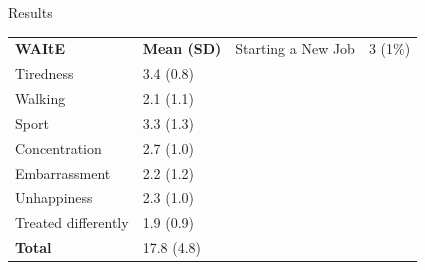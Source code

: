 \documentclass[t,compress,9pt,aspectratio=169]{beamer}
\begin{document}
\begin{frame}{Results}
\begin{table}[h]
\begin{tabular}{p{4cm} p{2cm} p{4cm} p{2cm}}
    \textbf{WAItE} & \textbf{Mean (SD)} & \quad Starting a New Job & 3 (1\%) \\
    \quad Tiredness & 3.4 (0.8) &  & \\
    \quad Walking & 2.1 (1.1) & \\
    \quad Sport & 3.3 (1.3) & \\
    \quad Concentration & 2.7 (1.0) & \\
    \quad Embarrassment & 2.2 (1.2) & \\
    \quad Unhappiness & 2.3 (1.0) & \\
    \quad Treated differently & 1.9 (0.9) &  &  \\
    \quad \textbf{Total} & 17.8 (4.8) & & \\
    \hline
    \end{tabular}
    \endgroup
    \end{table}
\end{frame}
\end{document}
